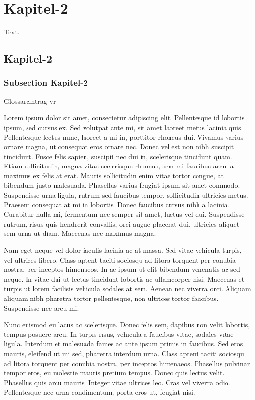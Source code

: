 \chapter{Kapitel-2}

Text.

\section{Kapitel-2}



\subsection{Subsection Kapitel-2}

Glossareintrag \gls{vr}

Lorem ipsum dolor sit amet, consectetur adipiscing elit. Pellentesque id lobortis ipsum, sed cursus ex. Sed volutpat ante mi, sit amet laoreet metus lacinia quis. Pellentesque lectus nunc, laoreet a mi in, porttitor rhoncus dui. Vivamus varius ornare magna, ut consequat eros ornare nec. Donec vel est non nibh suscipit tincidunt. Fusce felis sapien, suscipit nec dui in, scelerisque tincidunt quam. Etiam sollicitudin, magna vitae scelerisque rhoncus, sem mi faucibus arcu, a maximus ex felis at erat. Mauris sollicitudin enim vitae tortor congue, at bibendum justo malesuada. Phasellus varius feugiat ipsum sit amet commodo. Suspendisse urna ligula, rutrum sed faucibus tempor, sollicitudin ultricies metus. Praesent consequat at mi in lobortis. Donec faucibus cursus nibh a lacinia. Curabitur nulla mi, fermentum nec semper sit amet, luctus vel dui. Suspendisse rutrum, risus quis hendrerit convallis, orci augue placerat dui, ultricies aliquet sem urna ut diam. Maecenas nec maximus magna.

Nam eget neque vel dolor iaculis lacinia ac at massa. Sed vitae vehicula turpis, vel ultrices libero. Class aptent taciti sociosqu ad litora torquent per conubia nostra, per inceptos himenaeos. In ac ipsum ut elit bibendum venenatis ac sed neque. In vitae dui ut lectus tincidunt lobortis ac ullamcorper nisi. Maecenas et turpis ut lorem facilisis vehicula sodales at sem. Aenean nec viverra orci. Aliquam aliquam nibh pharetra tortor pellentesque, non ultrices tortor faucibus. Suspendisse nec arcu mi.

Nunc euismod eu lacus ac scelerisque. Donec felis sem, dapibus non velit lobortis, tempus posuere arcu. In turpis risus, vehicula a faucibus vitae, sodales vitae ligula. Interdum et malesuada fames ac ante ipsum primis in faucibus. Sed eros mauris, eleifend ut mi sed, pharetra interdum urna. Class aptent taciti sociosqu ad litora torquent per conubia nostra, per inceptos himenaeos. Phasellus pulvinar tempor eros, eu molestie mauris pretium tempus. Donec quis lectus velit. Phasellus quis arcu mauris. Integer vitae ultrices leo. Cras vel viverra odio. Pellentesque nec urna condimentum, porta eros ut, feugiat nisi.

